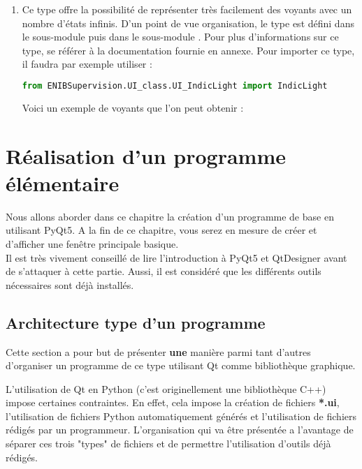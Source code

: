 \begin{enumerate}
\newpage

\item {}\newline
Ce type offre la possibilité de représenter très facilement des voyants avec un nombre d'états infinis.\newline
D'un point de vue organisation, le type  est défini dans le sous-module  puis dans le sous-module \newline {}.\newline
Pour plus d'informations sur ce type, se référer à la documentation fournie en annexe.\newline
Pour importer ce type, il faudra par exemple utiliser :
\begin{lstlisting}[language=Python]
from ENIBSupervision.UI_class.UI_IndicLight import IndicLight
\end{lstlisting}
Voici un exemple de voyants que l'on peut obtenir :

\end{enumerate}




\chapter{Réalisation d'un programme élémentaire}

Nous allons aborder dans ce chapitre la création d'un programme de base en utilisant PyQt5. A la fin de ce chapitre, vous serez en mesure de créer et d'afficher une fenêtre principale basique.\\

Il est très vivement conseillé de lire l'introduction à PyQt5 et QtDesigner avant de s'attaquer à cette partie. Aussi, il est considéré que les différents outils nécessaires sont déjà installés.



\section{Architecture type d'un programme}

Cette section a pour but de présenter \textbf{une} manière parmi tant d'autres d'organiser un programme de ce type utilisant Qt comme bibliothèque graphique.

L'utilisation de Qt en Python (c'est originellement une bibliothèque C++) impose certaines contraintes. En effet, cela impose la création de fichiers \textbf{*.ui}, l'utilisation de fichiers Python automatiquement générés et l'utilisation de fichiers rédigés par un programmeur.\newline
L'organisation qui va être présentée a l'avantage de séparer ces trois "types" de fichiers et de permettre l'utilisation d'outils déjà rédigés.


